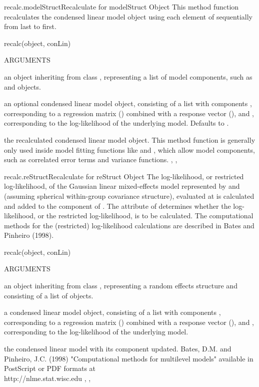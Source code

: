 \documentclass[pdftex]{article} \usepackage{url,graphicx}
\begin{document}
\begin{Helpfile}{recalc.modelStruct}{Recalculate for modelStruct Object}
This method function recalculates the condensed linear model object
using each element of  sequentially from last to first.
\begin{Example}
recalc(object, conLin)
\end{Example}
\begin{Argument}{ARGUMENTS}
\item[\Co{object:}]
an object inheriting from class ,
representing a list of model components, such as  and
 objects.
\item[\Co{conLin:}]
an optional  condensed linear model object, consisting of
a list with components , corresponding to a regression
matrix () combined with a response vector (), and 
, corresponding to the log-likelihood of the
underlying model. Defaults to .
\end{Argument}
the recalculated condensed linear model object.
 This method function is generally only used inside model fitting
functions like  and , which allow model
components, such as correlated error terms and variance functions.
, ,
\end{Helpfile}
\begin{Helpfile}{recalc.reStruct}{Recalculate for reStruct Object}
The log-likelihood, or restricted log-likelihood, of the
Gaussian linear mixed-effects model represented by  and
 (assuming spherical within-group covariance structure),
evaluated at  is calculated and added to the
 component of . The 
attribute of  determines whether the log-likelihood, or
the restricted log-likelihood, is to be calculated. The computational
methods for the (restricted) log-likelihood calculations are described
in Bates and Pinheiro (1998).
\begin{Example}
recalc(object, conLin)
\end{Example}
\begin{Argument}{ARGUMENTS}
\item[\Co{object:}]
an object inheriting from class ,
representing a random effects structure and consisting of a list of
 objects.
\item[\Co{conLin:}]
a condensed linear model object, consisting of a list
with components , corresponding to a regression matrix
() combined with a response vector (), and
, corresponding to the log-likelihood of the
underlying model.
\end{Argument}
the condensed linear model with its  component updated.
Bates, D.M. and Pinheiro, J.C. (1998) "Computational methods for
multilevel models" available in PostScript or PDF formats at \\
http://nlme.stat.wisc.edu
, ,
\end{Helpfile}
\end{document}

